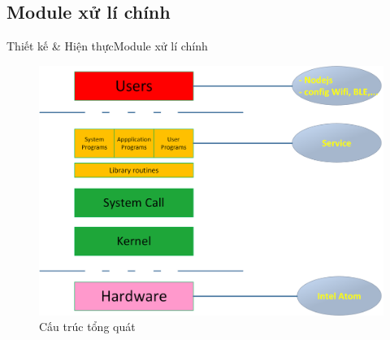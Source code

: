 \documentclass[compress, blue, 13pt,hyperref={pdfpagemode=FullScreen}]{beamer}
\begin{document}
\subsection{Module xử lí chính}
\begin{frame}{Thiết kế \& Hiện thực}{Module xử lí chính}
\begin{figure}[hbtp]
\centering
\includegraphics[scale=0.4]{images/architecture_os.png}
\caption{Cấu trúc tổng quát}
\end{figure}
\end{frame}
%
\end{document}
